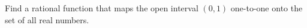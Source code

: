 Find a rational function that maps the open interval $(0,1)$ one-to-one onto the set of all real numbers.
